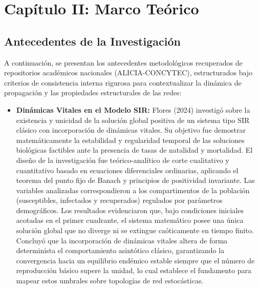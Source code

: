 \documentclass[12pt]{article}
\begin{document}
\section{Capítulo II: Marco Teórico}

\subsection{Antecedentes de la Investigación}
A continuación, se presentan los antecedentes metodológicos recuperados de repositorios académicos nacionales (ALICIA-CONCYTEC), estructurados bajo criterios de consistencia interna rigurosa para contextualizar la dinámica de propagación y las propiedades estructurales de las redes:

\begin{itemize}
    \item \textbf{Dinámicas Vitales en el Modelo SIR:} Flores (2024) investigó sobre la existencia y unicidad de la solución global positiva de un sistema tipo SIR clásico con incorporación de dinámicas vitales. Su objetivo fue demostrar matemáticamente la estabilidad y regularidad temporal de las soluciones biológicas factibles ante la presencia de tasas de natalidad y mortalidad. El diseño de la investigación fue teórico-analítico de corte cualitativo y cuantitativo basado en ecuaciones diferenciales ordinarias, aplicando el teorema del punto fijo de Banach y principios de positividad invariante. Las variables analizadas correspondieron a los compartimentos de la población (susceptibles, infectados y recuperados) regulados por parámetros demográficos. Los resultados evidenciaron que, bajo condiciones iniciales acotadas en el primer cuadrante, el sistema matemático posee una única solución global que no diverge ni se extingue caóticamente en tiempo finito. Concluyó que la incorporación de dinámicas vitales altera de forma determinista el comportamiento asintótico clásico, garantizando la convergencia hacia un equilibrio endémico estable siempre que el número de reproducción básico supere la unidad, lo cual establece el fundamento para mapear estos umbrales sobre topologías de red estocásticas.
    

\end{itemize}
\end{document}
